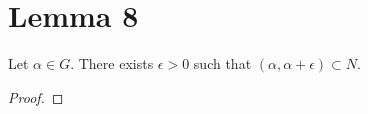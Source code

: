 \section{Lemma 8}
\begin{lemma}
Let $\alpha\in G$.
There exists $\epsilon>0$ such that $(\alpha,\alpha+\epsilon)\subset N$.
\begin{proof}


\end{proof}
\end{lemma}
